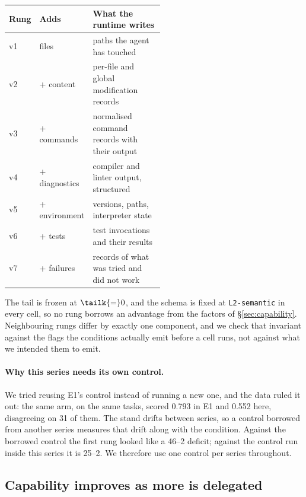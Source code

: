 \begin{center}
\begin{tabular}{@{}llp{0.52\linewidth}@{}}
\toprule
Rung & Adds & What the runtime writes \\
\midrule
v1 & files        & paths the agent has touched \\
v2 & + content    & per-file and global modification records \\
v3 & + commands   & normalised command records with their output \\
v4 & + diagnostics& compiler and linter output, structured \\
v5 & + environment& versions, paths, interpreter state \\
v6 & + tests      & test invocations and their results \\
v7 & + failures   & records of what was tried and did not work \\
\bottomrule
\end{tabular}
\end{center}

The tail is frozen at $\tailk{=}0$, and the schema is fixed at
\texttt{L2-semantic} in every cell, so no rung borrows an advantage from the
factors of \S\ref{sec:capability}. Neighbouring rungs differ by exactly one
component, and we check that invariant against the flags the conditions
actually emit before a cell runs, not against what we intended them to
emit\code.

\paragraph{Why this series needs its own control.} We tried reusing E1's
control instead of running a new one, and the data ruled it out: the same
arm, on the same \VTasks{} tasks, scored 0.793 in E1 and 0.552 here, disagreeing
on 31 of them\live. The stand drifts between series, so a control borrowed
from another series measures that drift along with the condition. Against
the borrowed control the first rung looked like a 46--2 deficit; against the
control run inside this series it is 25--2. We therefore use one control per
series throughout.

\subsection{Capability improves as more is delegated}

\begin{table}[t]
\centering
\caption{The composition ladder. Cost, turns and output are medians over tasks
that both the rung and the control solved; ratios below $1$ favour the rung.}
\label{tab:ladder}

\end{table}

